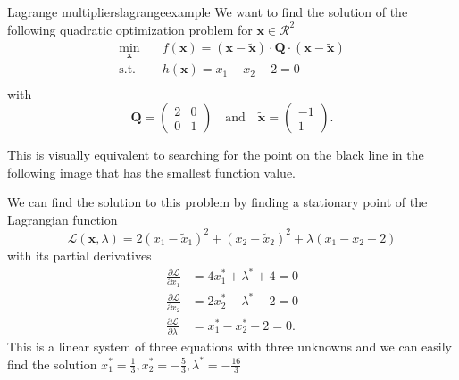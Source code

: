 \begin{example}{Lagrange multipliers}{lagrangeexample}
    We want to find the solution of the following quadratic optimization problem for $\mathbf{x} \in \mathcal{R}^2$
    \begin{equation}
        \begin{aligned}
            \min_{\mathbf{x}} \quad & f(\mathbf{x})= (\mathbf{x}-\tilde{\mathbf{x}}) \cdot \mathbf{Q} \cdot (\mathbf{x}-\tilde{\mathbf{x}})\\
            \textrm{s.t.} \quad     & h(\mathbf{x}) = x_1 - x_2 - 2 = 0  \\
        \end{aligned}
    \end{equation}
    with 
    \begin{equation}
        \mathbf{Q} = 
        \begin{pmatrix}
        2 & 0 \\
        0 & 1 
        \end{pmatrix} 
        \quad 
        \text{and}
        \quad
        \tilde{\mathbf{x}} = 
        \begin{pmatrix}
        -1\\
        1 
        \end{pmatrix}.
    \end{equation}

    This is visually equivalent to searching for the point on the black line in the following image that has the smallest function value.
    \begin{center}
        
    \end{center}

    We can find the solution to this problem by finding a stationary point of the Lagrangian function
    \begin{equation}
        \mathcal{L}(\mathbf{x}, \lambda) = 2 (x_1-\tilde{x}_1)^2 + (x_2-\tilde{x}_2)^2 + \lambda (x_1 - x_2 -2)
    \end{equation}
    with its partial derivatives 
    \begin{align}
        \frac{\partial \mathcal{L}}{\partial x_1} &= 4 x_1^* + \lambda^*  + 4 = 0\\
        \frac{\partial \mathcal{L}}{\partial x_2} &= 2 x_2^* - \lambda^*  -2 = 0\\
        \frac{\partial \mathcal{L}}{\partial \lambda} &= x_1^* - x_2^* -2 = 0.
    \end{align}
    This is a linear system of three equations with three unknowns and we can easily find the solution $x_1^*=\frac{1}{3} , x_2^*=-\frac{5}{3}, \lambda^*=-\frac{16}{3}$
\end{example}


